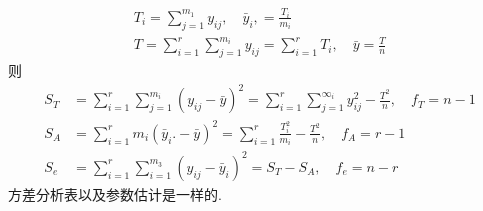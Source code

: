 \begin{itemize}
  \begin{gather*}
    T_{i}=\sum_{j=1}^{m_{1}} y_{i j}, \quad \bar{y}_{i},=\frac{T_{i}}{m_{i}} \\
    T=\sum_{i=1}^{r} \sum_{j=1}^{m_{i}} y_{i j}=\sum_{i=1}^{r} T_{i}, \quad \bar{y}=\frac{T}{n}
  \end{gather*}
  则 
  \begin{equation}
    \label{eq:8.1.28}
    \begin{split}
      S_{T} & =\sum_{i=1}^{r} \sum_{j=1}^{m_{i}}\left(y_{i j}-\bar{y}\right)^{2}=\sum_{i=1}^{r} \sum_{j=1}^{\infty_{i}} y_{i j}^{2}-\frac{T^{2}}{n}, \quad f_{T}=n-1 \\
      S_{A} & =\sum_{i=1}^{r} m_{i}\left(\bar{y}_{i} .-\bar{y}\right)^{2}=\sum_{i=1}^{r} \frac{T_{i}^{2}}{m_{i}}-\frac{T^{2}}{n}, \quad f_{A}=r-1 \\
      S_{e} & =\sum_{i=1}^{r} \sum_{i=1}^{m_{3}}\left(y_{i j}-\bar{y}_{i}\right)^{2}=S_{T}-S_{A},\quad f_e = n - r
    \end{split}
  \end{equation}
  方差分析表以及参数估计是一样的.
\end{itemize}

